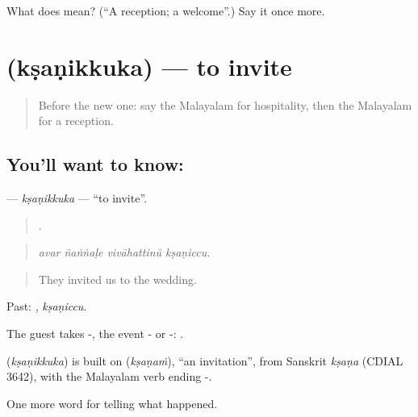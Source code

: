 \begin{tcolorbox}[breakable,colback=teal!4,colframe=teal!35!black,title={Before you move on}]
What does  mean? (\textquotedblleft{}A reception; a welcome\textquotedblright{}.) Say it once more.
\end{tcolorbox}
\section[\texorpdfstring{\ml{ക്ഷണിക്കുക} (kṣaṇikkuka)}{ക്ഷണിക്കുക (kṣaṇikkuka)}]{ (kṣaṇikkuka) — to invite}

\label{lesson:ML-C386-ksanikkuka}



\begin{quote}
Before the new one: say the Malayalam for hospitality, then the Malayalam for a reception.
\end{quote}

\subsection*{You'll want to know: }
\textbf{} — \emph{kṣaṇikkuka} — \textquotedblleft{}to invite\textquotedblright{}.

\begin{quote}
   .
\end{quote}

\begin{quote}
\emph{avar ñaṅṅaḷe vivāhattinŭ kṣaṇiccu.}
\end{quote}

\begin{quote}
They invited us to the wedding.
\end{quote}

Past: , \emph{kṣaṇiccu}.

The guest takes -, the event - or -:   .

\begin{cousinweb}
\textbf{} (\emph{kṣaṇikkuka}) is built on  (\emph{kṣaṇaṁ}), \textquotedblleft{}an invitation\textquotedblright{}, from Sanskrit \emph{kṣaṇa} (CDIAL 3642), with the Malayalam verb ending -.
\end{cousinweb}

\begin{grammarlens}[title={What you've built}]
One more word for telling what happened.
\end{grammarlens}

